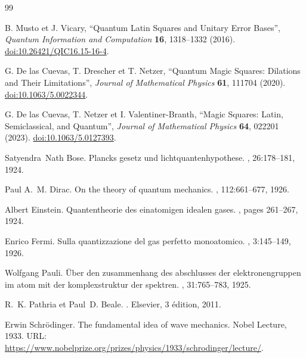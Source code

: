 \begingroup\fontsize{9.2}{10.6}\selectfont
\begin{thebibliography}{99}\fontsize{9.2}{10.6}\selectfont\setlength{\parsep}{0pt}\setlength{\itemsep}{1pt}\setlength{\parskip}{0pt}
{}
 B. Musto et J. Vicary, ``Quantum Latin Squares and Unitary Error Bases'', \emph{Quantum Information and Computation} \textbf{16}, 1318--1332 (2016). \href{https://doi.org/10.26421/QIC16.15-16-4}{doi:10.26421/QIC16.15-16-4}.

 G. De las Cuevas, T. Drescher et T. Netzer, ``Quantum Magic Squares: Dilations and Their Limitations'', \emph{Journal of Mathematical Physics} \textbf{61}, 111704 (2020). \href{https://doi.org/10.1063/5.0022344}{doi:10.1063/5.0022344}.

 G. De las Cuevas, T. Netzer et I. Valentiner-Branth, ``Magic Squares: Latin, Semiclassical, and Quantum'', \emph{Journal of Mathematical Physics} \textbf{64}, 022201 (2023). \href{https://doi.org/10.1063/5.0127393}{doi:10.1063/5.0127393}.

Satyendra~Nath Bose.
\newblock Plancks gesetz und lichtquantenhypothese.
, 26:178--181, 1924.

Paul A.~M. Dirac.
\newblock On the theory of quantum mechanics.
, 112:661--677, 1926.

Albert Einstein.
\newblock Quantentheorie des einatomigen idealen gases.
,
  pages 261--267, 1924.

Enrico Fermi.
\newblock Sulla quantizzazione del gas perfetto monoatomico.
, 3:145--149, 1926.

Wolfgang Pauli.
\newblock Über den zusammenhang des abschlusses der elektronengruppen im atom
  mit der komplexstruktur der spektren.
, 31:765--783, 1925.

R.~K. Pathria et Paul~D. Beale.
.
\newblock Elsevier, 3 édition, 2011.

Erwin Schrödinger.
\newblock The fundamental idea of wave mechanics.
\newblock Nobel Lecture, 1933.
\newblock URL:
  \url{https://www.nobelprize.org/prizes/physics/1933/schrodinger/lecture/}.


\end{thebibliography}
